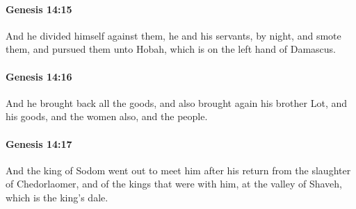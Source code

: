 		\paragraph{Genesis 14:15} %
			\label{GENESIS-14-15}

			And he divided himself against them, he and his servants, by night, and smote them, and pursued them unto Hobah, which is on the left hand of Damascus.


		\paragraph{Genesis 14:16} %
			\label{GENESIS-14-16}

			And he brought back all the goods, and also brought again his brother Lot, and his goods, and the women also, and the people.


		\paragraph{Genesis 14:17} %
			\label{GENESIS-14-17}

			And the king of Sodom went out to meet him after his return from the slaughter of Chedorlaomer, and of the kings that were with him, at the valley of Shaveh, which is the king's dale.


